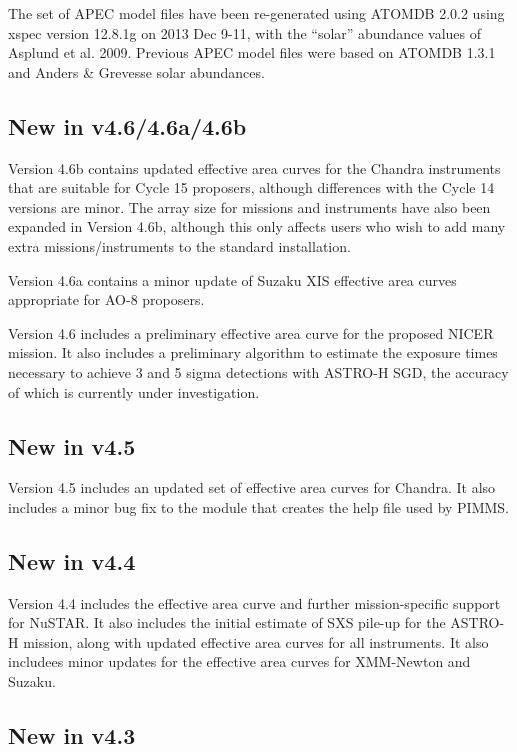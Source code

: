 \documentclass[11pt]{article}
\begin{document}
The set of APEC model files have been re-generated using ATOMDB 2.0.2 using
xspec version 12.8.1g on 2013 Dec 9-11, with the ``solar'' abundance values of
Asplund et al. 2009.  Previous APEC model files were based on ATOMDB 1.3.1 and
Anders \& Grevesse solar abundances.

\subsection{New in v4.6/4.6a/4.6b}

Version 4.6b contains updated effective area curves for the Chandra
instruments that are suitable for Cycle 15 proposers, although differences
with the Cycle 14 versions are minor.  The array size for missions and
instruments have also been expanded in Version 4.6b, although this only
affects users who wish to add many extra missions/instruments to the
standard installation.

Version 4.6a contains a minor update of Suzaku XIS effective area curves
appropriate for AO-8 proposers.

Version 4.6 includes a preliminary effective area curve for the proposed
NICER mission.  It also includes a preliminary algorithm to estimate the
exposure times necessary to achieve 3 and 5 sigma detections with ASTRO-H
SGD, the accuracy of which is currently under investigation.

\subsection{New in v4.5}

Version 4.5 includes an updated set of effective area curves for Chandra.
It also includes a minor bug fix to the module that creates the help file
used by PIMMS.

\subsection{New in v4.4}

Version 4.4 includes the effective area curve and further mission-specific
support for NuSTAR.  It also includes the initial estimate of SXS pile-up
for the ASTRO-H mission, along with updated effective area curves for all
instruments.  It also includees minor updates for the effective area curves
for XMM-Newton and Suzaku.

\subsection{New in v4.3}
\end{document}
